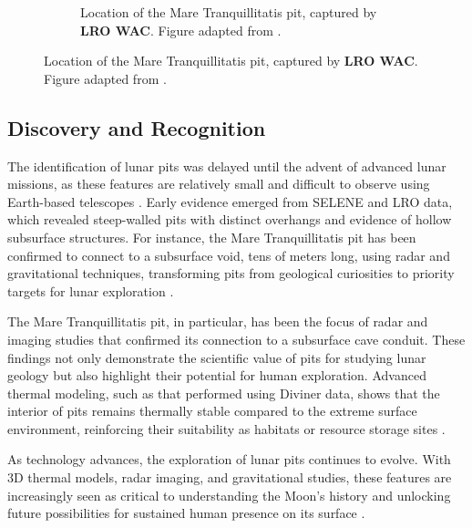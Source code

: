 \begin{figure}[h!]
\begin{subfigure}[c]{0.4\linewidth}
        \caption{Location of the Mare Tranquillitatis pit, captured by \textbf{LRO WAC}. Figure adapted from \cite{sublunear-lava}.}
        \label{fig:image2}
    \end{subfigure}
\end{figure}

\subsection{Discovery and Recognition}
The identification of lunar pits was delayed until the advent of advanced lunar missions, as these features are relatively small and difficult to observe using Earth-based telescopes \cite{lunar-pit-distribution}. Early evidence emerged from SELENE and LRO data, which revealed steep-walled pits with distinct overhangs and evidence of hollow subsurface structures. For instance, the Mare Tranquillitatis pit has been confirmed to connect to a subsurface void, tens of meters long, using radar and gravitational techniques, transforming pits from geological curiosities to priority targets for lunar exploration \cite{Carrer2024, GRAIL, radar-observations-lava-tubes}.

The Mare Tranquillitatis pit, in particular, has been the focus of radar and imaging studies that confirmed its connection to a subsurface cave conduit. These findings not only demonstrate the scientific value of pits for studying lunar geology but also highlight their potential for human exploration. Advanced thermal modeling, such as that performed using Diviner data, shows that the interior of pits remains thermally stable compared to the extreme surface environment, reinforcing their suitability as habitats or resource storage sites \cite{newer-thermal, lunar-pits-entrances-to-caves, thermal-lunar-pits}.

As technology advances, the exploration of lunar pits continues to evolve. With 3D thermal models, radar imaging, and gravitational studies, these features are increasingly seen as critical to understanding the Moon’s history and unlocking future possibilities for sustained human presence on its surface \cite{newer-thermal, radar-observations-lava-tubes, grails-gradients-mariushills}.
